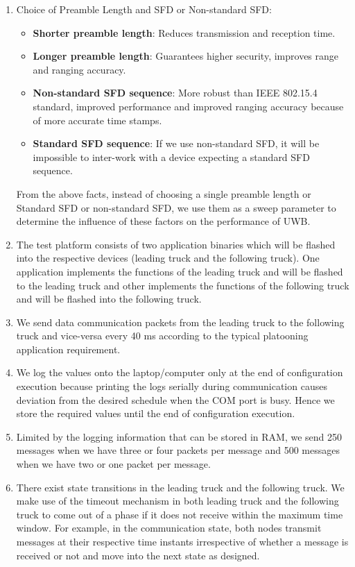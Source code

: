 \begin{enumerate}
    \item Choice of Preamble Length and SFD or Non-standard SFD:  
    \begin{itemize}
        \item \textbf{Shorter preamble length}: Reduces transmission and reception time.
        \item \textbf{Longer preamble length}: Guarantees higher security, improves range and ranging accuracy.
        \item \textbf{Non-standard SFD sequence}: More robust than IEEE 802.15.4 standard, improved performance and improved ranging accuracy because of more accurate time stamps.
        \item \textbf{Standard SFD sequence}: If we use non-standard SFD, it will be impossible to inter-work with a device expecting a standard SFD sequence.
    \end{itemize}    
    From the above facts, instead of choosing a single preamble length or Standard SFD or non-standard SFD, we use them as a sweep parameter to determine the influence of these factors on the performance of UWB.   
    \item The test platform consists of two application binaries which will be flashed into the respective devices (leading truck and the following truck). One application implements the functions of the leading truck and will be flashed to the leading truck and other implements the functions of the following truck and will be flashed into the following truck.
    \item We send data communication packets from the leading truck to the following truck and vice-versa every 40 ms according to the typical platooning application requirement.
    \item We log the values onto the laptop/computer only at the end of configuration execution because printing the logs serially during communication causes deviation from the desired schedule when the COM port is busy. Hence we store the required values until the end of configuration execution.
    \item Limited by the logging information that can be stored in RAM, we send 250 messages when we have three or four packets per message and 500 messages when we have two or one packet per message.
    \item There exist state transitions in the leading truck and the following truck. We make use of the timeout mechanism in both leading truck and the following truck to come out of a phase if it does not receive within the maximum time window. For example, in the communication state, both nodes transmit messages at their respective time instants irrespective of whether a message is received or not and move into the next state as designed.

\end{enumerate}
